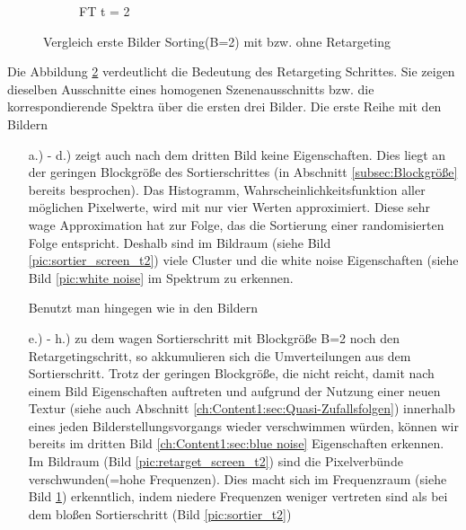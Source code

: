 \begin{figure}[H]
\begin{subfigure}[b]{0.2\linewidth}
         \caption{FT t = 2}
         \label{pic:retarget_t2}
    \end{subfigure}
    \caption{Vergleich erste Bilder Sorting(B=2) mit bzw. ohne Retargeting}
    \label{fig:VergleichRetargetSorting}
      
\end{figure}

Die Abbildung \ref{fig:VergleichRetargetSorting} verdeutlicht die Bedeutung des Retargeting 
Schrittes. Sie zeigen dieselben Ausschnitte eines homogenen Szenenausschnitts bzw. die korrespondierende 
Spektra über die ersten drei Bilder. Die erste Reihe mit den Bildern
\begin{itemize}
    \item[a.) - d.)] zeigt auch nach dem dritten Bild keine  Eigenschaften.
                     Dies liegt an der geringen Blockgröße des Sortierschrittes 
                     (in Abschnitt \ref{subsec:Blockgröße} bereits besprochen). Das Histogramm, Wahrscheinlichkeitsfunktion
                     aller möglichen Pixelwerte, wird mit nur vier Werten approximiert. Diese sehr wage Approximation 
                     hat zur Folge, das die Sortierung einer randomisierten Folge entspricht. Deshalb sind im Bildraum
                     (siehe Bild \ref{pic:sortier_screen_t2}) viele Cluster und die white noise Eigenschaften 
                     (siehe Bild \ref{pic:white noise} im Spektrum zu erkennen.
                     \par 
                    Benutzt man hingegen wie in den Bildern  
    \item[e.) - h.)] zu dem wagen Sortierschritt mit Blockgröße B=2 noch den Retargetingschritt, so akkumulieren sich die 
                    Umverteilungen aus dem Sortierschritt. Trotz der geringen Blockgröße, die nicht reicht, damit nach einem 
                    Bild  Eigenschaften auftreten und aufgrund der Nutzung einer neuen 
                    Textur (siehe auch Abschnitt \ref{ch:Content1:sec:Quasi-Zufallsfolgen}) innerhalb eines jeden 
                    Bilderstellungsvorgangs wieder verschwimmen würden, können wir bereits im dritten Bild 
                    \ref{ch:Content1:sec:blue noise} Eigenschaften erkennen. Im Bildraum (Bild \ref{pic:retarget_screen_t2})
                    sind die Pixelverbünde verschwunden(=hohe Frequenzen). Dies macht sich im Frequenzraum 
                    (siehe Bild \ref{pic:retarget_t2}) erkenntlich, indem niedere Frequenzen weniger vertreten sind 
                    als bei dem bloßen Sortierschritt (Bild \ref{pic:sortier_t2})
\end{itemize}

